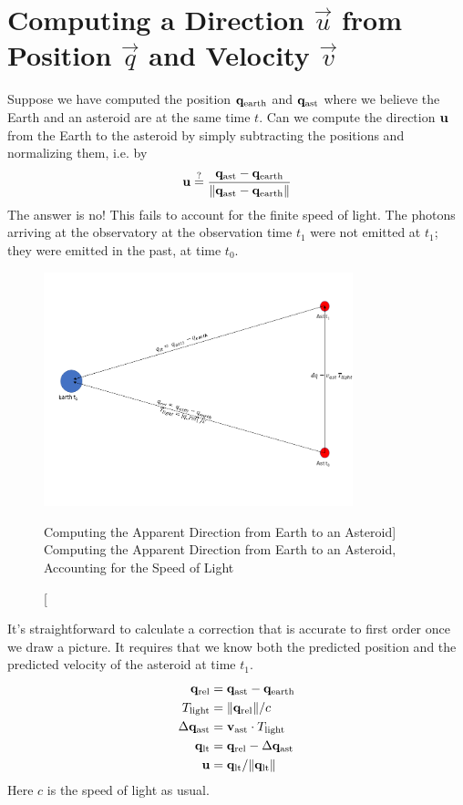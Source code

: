 \section{Computing a Direction $\vec{u}$ from Position $\vec{q}$ and Velocity $\vec{v}$}
\label{section_pos_vel_to_dir}
Suppose we have computed the position $\mathbf{q}_{\mathrm{earth}}$ and $\mathbf{q}_{\mathrm{ast}}$ where we believe the Earth and an asteroid are at the same time $t$.
Can we compute the direction $\mathbf{u}$ from the Earth to the asteroid by simply subtracting the positions and normalizing them, i.e. by
$$ \mathbf{u} \stackrel{?}{=} \frac{\mathbf{q}_{\mathrm{ast}} - \mathbf{q}_{\mathrm{earth}}}{\lVert\mathbf{q}_{\mathrm{ast}} - \mathbf{q}_{\mathrm{earth}}\rVert}$$
The answer is no! This fails to account for the finite speed of light.
The photons arriving at the observatory at the observation time $t_1$ were not emitted at $t_1$; they were emitted in the past, at time $t_0$.
\begin{figure}[hbt!]
\begin{center}
\includegraphics[width=0.8\textwidth]{../figs/misc/light_time.png}
\caption
[Computing the Apparent Direction from Earth to an Asteroid]
{Computing the Apparent Direction from Earth to an Asteroid, Accounting for the Speed of Light}
\end{center}
\end{figure}
It's straightforward to calculate a correction that is accurate to first order once we draw a picture.
It requires that we know both the predicted position and the predicted velocity of the asteroid at time $t_1$.
\begin{align*}
\mathbf{q}_{\mathrm{rel}} &= \mathbf{q}_{\mathrm{ast}} - \mathbf{q}_{\mathrm{earth}} \\
T_{\mathrm{light}} &= \lVert \mathbf{q}_{\mathrm{rel}} \rVert / c \\
\Delta \mathbf{q}_{\mathrm{ast}} &= \mathbf{v}_{\mathrm{ast}} \cdot T_{\mathrm{light}} \\
\mathbf{q}_{\mathrm{lt}} &= \mathbf{q}_{\mathrm{rel}} - \Delta \mathbf{q}_{\mathrm{ast}} \\
\mathbf{u} &= \mathbf{q}_{\mathrm{lt}} / \lVert\mathbf{q}_{\mathrm{lt}}\rVert
\end{align*}
Here $c$ is the speed of light as usual.


